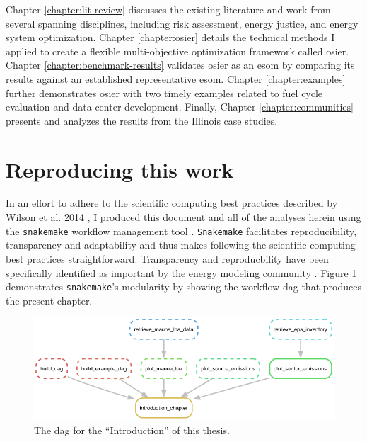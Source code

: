 Chapter \ref{chapter:lit-review} discusses the existing literature and work from
several spanning disciplines, including risk assessment, energy justice, and
energy system optimization. Chapter \ref{chapter:osier} details the technical
methods I applied to create a flexible multi-objective optimization framework
called \ac{osier}. Chapter \ref{chapter:benchmark-results} validates \ac{osier}
as an \ac{esom} by comparing its results against an established representative
\ac{esom}. Chapter \ref{chapter:examples} further demonstrates \ac{osier} with
two timely examples related to fuel cycle evaluation and data center
development. Finally, Chapter \ref{chapter:communities} presents and analyzes
the results from the Illinois case studies.

\section{Reproducing this work}
In an effort to adhere to the scientific computing best practices described by
Wilson et al. 2014 \cite{wilson_best_2014}, I produced this document and all of
the analyses herein using the \texttt{snakemake} workflow management tool
\cite{molder_sustainable_2021}. \texttt{Snakemake} facilitates reproducibility,
transparency and adaptability and thus makes following the scientific computing
best practices straightforward. Transparency and reproducbility have been
specifically identified as important by the energy modeling community
\cite{decarolis_formalizing_2017,pfenninger_energy_2014}. Figure
\ref{fig:intro-dag} demonstrates \texttt{snakemake}'s modularity by showing the
workflow \ac{dag} that produces the present chapter. 

\begin{figure}[ht!]
    \centering
    \includegraphics[width=\columnwidth]{../analysis/introduction_chapter_dag.png}
    \caption{The \ac{dag} for the ``Introduction'' of this thesis.}
    \label{fig:intro-dag}
\end{figure}

